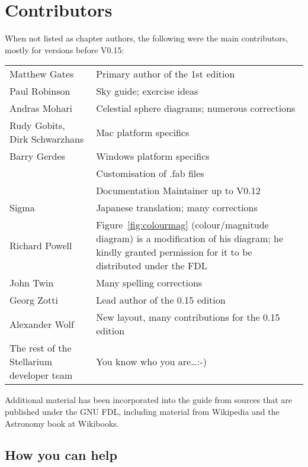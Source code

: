 
\chapter{Contributors}

When not listed as chapter authors, the following were the main contributors, mostly for versions before V0.15:
\begin{longtabu} to \textwidth {l|X}
\toprule
Matthew Gates & Primary author of the 1st edition\\
Paul Robinson &Sky guide; exercise ideas\\
Andras Mohari &Celestial sphere diagrams; numerous corrections\\
Rudy Gobits, Dirk Schwarzhans & Mac platform specifics\\
Barry Gerdes&Windows platform specifics \\
            &Customisation of .fab files\\
            &Documentation Maintainer up to V0.12\\
Sigma       &Japanese translation; many corrections\\ %
Richard Powell& Figure~\ref{fig:colourmag} (colour/magnitude diagram) is a modification of his diagram; he kindly granted permission for it to be distributed under the FDL\\
John Twin & Many spelling corrections \\
Georg Zotti & Lead author of the 0.15 edition\\
Alexander Wolf & New layout, many contributions for the 0.15 edition\\
The rest of the Stellarium developer team & You know who you are\ldots :-)\tabularnewline
\bottomrule
\end{longtabu}


Additional material has been incorporated into the guide from sources
that are published under the GNU FDL, including material from Wikipedia
and the Astronomy book at Wikibooks.

\section{How you can help}
\label{sec:HowYouCanHelp}


